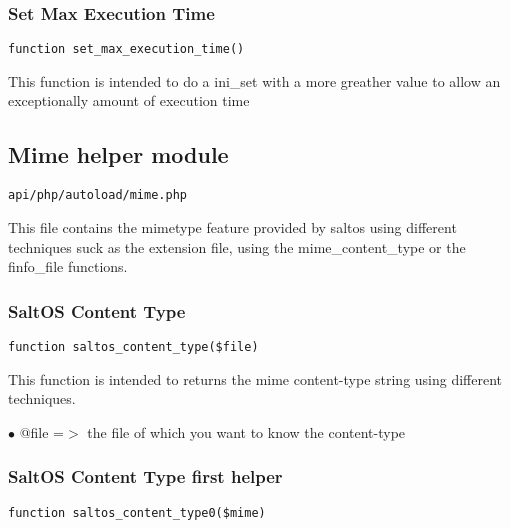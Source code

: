 \documentclass[a4paper]{article}
\begin{document}
\hypertarget{toc173}{}
\subsubsection{Set Max Execution Time}

\begin{lstlisting}
function set_max_execution_time()
\end{lstlisting}

This function is intended to do a ini\_set with a more greather value to allow an
exceptionally amount of execution time

\hypertarget{toc174}{}
\subsection{Mime helper module}

\begin{lstlisting}
api/php/autoload/mime.php
\end{lstlisting}

This file contains the mimetype feature provided by saltos using different techniques
suck as the extension file, using the mime\_content\_type or the finfo\_file functions.

\hypertarget{toc175}{}
\subsubsection{SaltOS Content Type}

\begin{lstlisting}
function saltos_content_type($file)
\end{lstlisting}

This function is intended to returns the mime content-type string using different
techniques.

\begin{compactitem}
\item[\color{myblue}$\bullet$] @file =$>$ the file of which you want to know the content-type
\end{compactitem}

\hypertarget{toc176}{}
\subsubsection{SaltOS Content Type first helper}

\begin{lstlisting}
function saltos_content_type0($mime)
\end{lstlisting}
\end{document}
